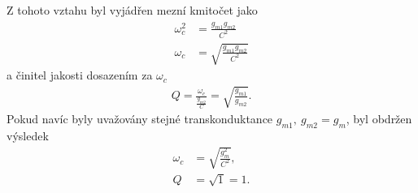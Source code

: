 Z tohoto vztahu byl vyjádřen mezní kmitočet jako 
\begin{align}
\omega _c^2 &= \frac{g_{m1}g_{m2}}{C^2} \\
\omega _c &= \sqrt{\frac{g_{m1}g_{m2}}{C^2}}
\end{align}
a činitel jakosti dosazením za $\omega _c$
\begin{align}
Q = \frac{\omega _c}{\frac{g_{m2}}{C}} = \sqrt{\frac{g_{m1}}{g_{m2}}}.
\end{align}
Pokud navíc byly uvažovány stejné transkonduktance $g_{m1}, \ g_{m2} = g_m$, byl obdržen výsledek
\begin{align}
\omega _c &= \sqrt{\frac{g_m^2}{C^2}},\\
Q &= \sqrt{1} = 1.
\end{align}